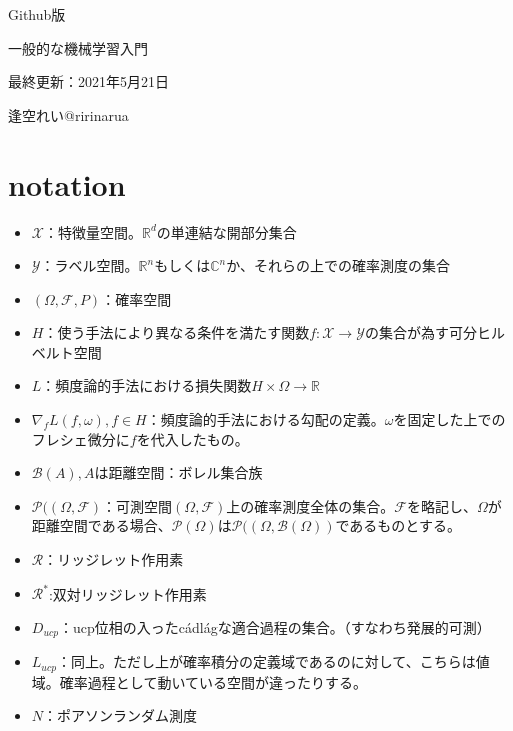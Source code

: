 \documentclass{jsarticle}
\begin{document}
\begin{center}
  
  \Huge Github版 \par
  \vspace{15mm}
  \Huge 一般的な機械学習入門\par
  \vspace{90mm}
  \Large 最終更新：2021年5月21日 \par
  \Large 逢空れい@ririnarua\par

\end{center}
\thispagestyle{empty}
\clearpage
\addtocounter{page}{-1}







\newpage


 \tableofcontents
 \clearpage
\section*{notation}
\begin{itemize}
\item $\mathcal{X}$：特徴量空間。$\mathbb{R}^d$の単連結な開部分集合
\item $\mathcal{Y}$：ラベル空間。$\mathbb{R}^n$もしくは$\mathbb{C}^n$か、それらの上での確率測度の集合
\item $(\Omega,\mathcal{F},P)$：確率空間
\item $H$：使う手法により異なる条件を満たす関数$f:\mathcal{X}\to\mathcal{Y}$の集合が為す可分ヒルベルト空間
\item $L$：頻度論的手法における損失関数$H\times\Omega \to \mathbb{R}$
\item $\nabla_f L(f,\omega),f\in H$：頻度論的手法における勾配の定義。$\omega$を固定した上でのフレシェ微分に$f$を代入したもの。
\item $\mathcal{B}(A),A$は距離空間：ボレル集合族
\item $\mathcal{P}((\Omega,\mathcal{F})$：可測空間$(\Omega,\mathcal{F})$上の確率測度全体の集合。$\mathcal{F}$を略記し、$\Omega$が距離空間である場合、$\mathcal{P}(\Omega)$は$\mathcal{P}((\Omega,\mathcal{B}(\Omega))$であるものとする。
\item $\mathcal{R}$：リッジレット作用素
\item $\mathcal{R}^*$:双対リッジレット作用素
\item $D_{ucp}$：ucp位相の入ったc\'{a}dl\'{a}gな適合過程の集合。（すなわち発展的可測）
\item $L_{ucp}$：同上。ただし上が確率積分の定義域であるのに対して、こちらは値域。確率過程として動いている空間が違ったりする。
\item $N$：ポアソンランダム測度
\end{itemize}
\end{document}

